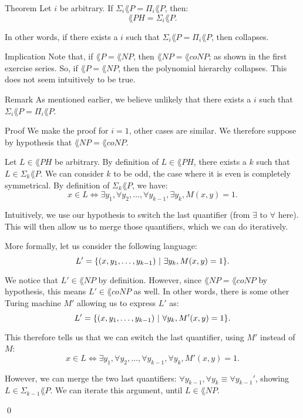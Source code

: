 \documentclass[a4paper]{article}
\begin{document}
\begin{parag}{Theorem}
    Let $i$ be arbitrary. If $\Sigma_i \lang{P} = \Pi_i \lang{P}$, then:
    \[\lang{PH} = \Sigma_i \lang{P}.\]

    In other words, if there exists a $i$ such that $\Sigma_i \lang{P} = \Pi_i \lang{P}$, then  collapses.

    \begin{subparag}{Implication}
        Note that, if $\lang{P} = \lang{NP}$, then $\lang{NP} = \lang{coNP}$; as shown in the first exercise series. So, if $\lang{P} = \lang{NP}$, then the polynomial hierarchy collapses. This does not seem intuitively to be true.
    \end{subparag}
    
    \begin{subparag}{Remark}
        As mentioned earlier, we believe unlikely that there exists a $i$ such that $\Sigma_i \lang{P} = \Pi_i \lang{P}$.
    \end{subparag}

    \begin{subparag}{Proof}
        We make the proof for $i = 1$, other cases are similar. We therefore suppose by hypothesis that $\lang{NP} = \lang{coNP}$.

        Let $L \in \lang{PH}$ be arbitrary. By definition of $L \in \lang{PH}$, there exists a $k$ such that $L \in \Sigma_k \lang{P}$. We can consider $k$ to be odd, the case where it is even is completely symmetrical. By definition of $\Sigma_k \lang{P}$, we have: 
        \[x \in L \iff \exists y_1, \forall y_2, \ldots, \forall y_{k-1}, \exists y_k, M\left(x, y\right) = 1.\]

        Intuitively, we use our hypothesis to switch the last quantifier (from $\exists$ to $\forall$ here). This will then allow us to merge those quantifiers, which we can do iteratively.

        More formally, let us consider the following language:
        \[L' = \left\{\left(x, y_1, \ldots, y_{k-1}\right) \suchthat \exists y_k, M\left(x, y\right) = 1\right\}.\]

        We notice that $L' \in \lang{NP}$ by definition. However, since $\lang{NP} = \lang{coNP}$ by hypothesis, this means $L' \in \lang{coNP}$ as well. In other words, there is some other Turing machine $M'$ allowing us to express $L'$ as:
        \[L' = \left\{\left(x, y_1, \ldots, y_{k-1}\right) \suchthat \forall y_k, M'\left(x, y\right) = 1\right\}.\]

        This therefore tells us that we can switch the last quantifier, using $M'$ instead of $M$:
        \[x \in L \iff \exists y_1, \forall y_2, \ldots, \forall y_{k-1}, \forall y_k, M'\left(x, y\right) = 1.\]

        However, we can merge the two last quantifiers: $\forall y_{k-1}, \forall y_k \equiv \forall y_{k-1}'$, showing $L \in \Sigma_{k-1} \lang{P}$. We can iterate this argument, until $L \in \lang{NP}$.

        \qed
    \end{subparag}
\end{parag}
\end{document}
